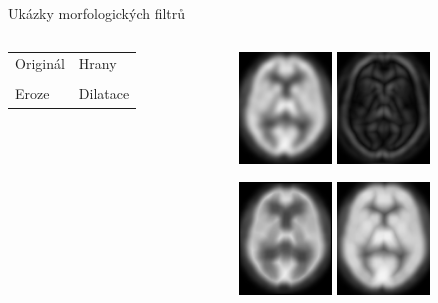 \documentclass[compress,mathserif]{beamer}
\theoremstyle{definition}
\theoremstyle{plain}
\begin{document}
    \begin{frame}{Ukázky morfologických filtrů}
    
    \begin{columns}
    \begin{column}{0.3\textwidth}
        \begin{table}
          \begin{tabular}{ll}
            Originál \hfill & Hrany \hfill\\
            \vspace{2.5cm} & \\
            Eroze  & Dilatace \\
          \end{tabular}
        \end{table}
    \end{column} 
    
    \begin{column}{0.6\textwidth}  
    \begin{figure}
     \includegraphics[width = 70pt]{img/original.png}
             \hspace{10pt}
     \includegraphics[width = 70pt]{img/hrany.png}
    \end{figure}
    \vspace{-10pt}
    \begin{figure}
    \includegraphics[width = 70pt]{img/eroze.png}
         \hspace{10pt}
    \includegraphics[width = 70pt]{img/dilatace.png}
    \end{figure}
    \end{column}
    \end{columns}
        
    
    \end{frame}
\end{document}
